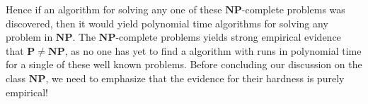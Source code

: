 Hence if an algorithm for solving any one of these $\mathbf{NP}$-complete problems was discovered, then it would yield polynomial time algorithms for solving any problem in $\mathbf{NP}$. The $\mathbf{NP}$-complete problems yields strong empirical evidence that $\mathbf{P} \neq \mathbf{NP}$, as no one has yet to find a algorithm with runs in polynomial time for a single of these well known problems. Before concluding our discussion on the class $\mathbf{NP}$, we need to emphasize that the evidence for their hardness is purely empirical!
